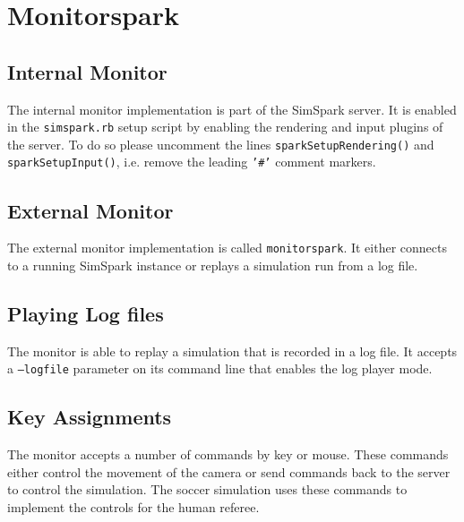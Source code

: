 \chapter{Monitorspark}

\section{Internal Monitor}

The internal monitor implementation is part of the SimSpark server. It
is enabled in the \texttt{simspark.rb} setup script by enabling the
rendering and input plugins of the server. To do so please uncomment
the lines \texttt{sparkSetupRendering()} and
\texttt{sparkSetupInput()}, i.e. remove the leading \texttt{'\#'} comment markers.

\section{External Monitor}

The external monitor implementation is called
\texttt{monitorspark}. It either connects to a running SimSpark
instance or replays a simulation run from a log file.

\section{Playing Log files}

The monitor is able to replay a simulation that is recorded in a log
file. It accepts a \texttt{--logfile} parameter on its command line
that enables the log player mode.

\section{Key Assignments}

The monitor accepts a number of commands by key or mouse. These
commands either control the movement of the camera or send commands
back to the server to control the simulation. The soccer simulation
uses these commands to implement the controls for the human referee.

